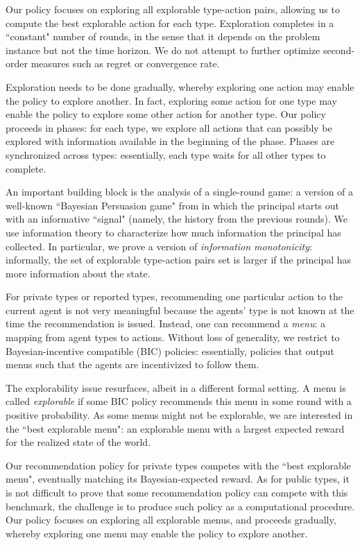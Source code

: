Our policy focuses on exploring all explorable type-action pairs, allowing us to compute the best explorable action for each type. Exploration completes in a ``constant" number of rounds, in the sense that it depends on the problem instance but not the time horizon. We do not attempt to further optimize second-order measures such as regret or convergence rate.

Exploration needs to be done gradually, whereby exploring one action may enable the policy to explore another. In fact, exploring some action for one type may enable the policy to explore some other action for another type. Our policy proceeds in phases: for each type, we explore all actions that can possibly be explored with information available in the beginning of the phase. Phases are synchronized across types: essentially, each type waits for all other types to complete.

An important building block is the analysis of a single-round game: a version of a well-known ``Bayesian Persuasion game" from \cite{Kamenica-aer11} in which the principal starts out with an informative ``signal" (namely, the history from the previous rounds). We use information theory to characterize how much information the principal has collected. In particular, we prove a version of \emph{information monotonicity}: informally, the set of explorable type-action pairs set is larger if the principal has more information about the state.


For private types or reported types, recommending one particular action to the current agent is not very meaningful because the agents' type is not known at the time the recommendation is issued. Instead, one can recommend a \emph{menu}: a mapping from agent types to actions. Without loss of generality, we restrict to  Bayesian-incentive compatible (BIC) policies: essentially, policies that output menus such that the agents are incentivized to follow them.

The explorability issue resurfaces, albeit in a different formal setting. A menu is called \emph{explorable} if some BIC policy recommends this menu in some round with a positive probability. As some menus might not be explorable, we are interested in the ``best explorable menu": an explorable menu with a largest expected reward for the realized state of the world.

Our recommendation policy for private types competes with the ``best explorable menu", eventually matching its Bayesian-expected reward. As for public types, it is not difficult to prove that some recommendation policy can compete with this benchmark, the challenge is to produce such policy as a computational procedure. Our policy focuses on exploring all explorable menus, and proceeds gradually, whereby exploring one menu may enable the policy to explore another. 

